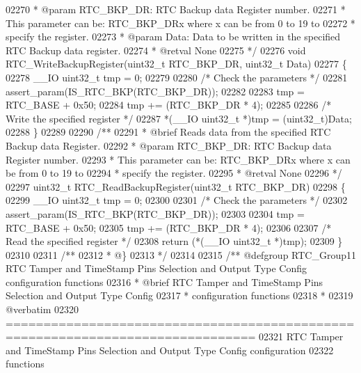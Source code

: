 \begin{DoxyCode}
02270 \textcolor{comment}{  * @param  RTC\_BKP\_DR: RTC Backup data Register number.}
02271 \textcolor{comment}{  *          This parameter can be: RTC\_BKP\_DRx where x can be from 0 to 19 to }
02272 \textcolor{comment}{  *                          specify the register.}
02273 \textcolor{comment}{  * @param  Data: Data to be written in the specified RTC Backup data register.                     }
02274 \textcolor{comment}{  * @retval None}
02275 \textcolor{comment}{  */}
02276 \textcolor{keywordtype}{void} RTC_WriteBackupRegister(uint32\_t RTC\_BKP\_DR, uint32\_t Data)
02277 \{
02278   \_\_IO uint32\_t tmp = 0;
02279 
02280   \textcolor{comment}{/* Check the parameters */}
02281   assert_param(IS\_RTC\_BKP(RTC\_BKP\_DR));
02282 
02283   tmp = RTC_BASE + 0x50;
02284   tmp += (RTC\_BKP\_DR * 4);
02285 
02286   \textcolor{comment}{/* Write the specified register */}
02287   *(\_\_IO uint32\_t *)tmp = (uint32\_t)Data;
02288 \}
02289 
02290 \textcolor{comment}{/**}
02291 \textcolor{comment}{  * @brief  Reads data from the specified RTC Backup data Register.}
02292 \textcolor{comment}{  * @param  RTC\_BKP\_DR: RTC Backup data Register number.}
02293 \textcolor{comment}{  *          This parameter can be: RTC\_BKP\_DRx where x can be from 0 to 19 to }
02294 \textcolor{comment}{  *                          specify the register.                   }
02295 \textcolor{comment}{  * @retval None}
02296 \textcolor{comment}{  */}
02297 uint32\_t RTC_ReadBackupRegister(uint32\_t RTC\_BKP\_DR)
02298 \{
02299   \_\_IO uint32\_t tmp = 0;
02300 
02301   \textcolor{comment}{/* Check the parameters */}
02302   assert_param(IS\_RTC\_BKP(RTC\_BKP\_DR));
02303 
02304   tmp = RTC_BASE + 0x50;
02305   tmp += (RTC\_BKP\_DR * 4);
02306 
02307   \textcolor{comment}{/* Read the specified register */}
02308   \textcolor{keywordflow}{return} (*(\_\_IO uint32\_t *)tmp);
02309 \}
02310 
02311 \textcolor{comment}{/**}
02312 \textcolor{comment}{  * @\}}
02313 \textcolor{comment}{  */}
02314 
02315 \textcolor{comment}{/** @defgroup RTC\_Group11 RTC Tamper and TimeStamp Pins Selection and Output Type Config configuration
       functions}
02316 \textcolor{comment}{ *  @brief   RTC Tamper and TimeStamp Pins Selection and Output Type Config }
02317 \textcolor{comment}{ *           configuration functions  }
02318 \textcolor{comment}{ *}
02319 \textcolor{comment}{@verbatim   }
02320 \textcolor{comment}{ ===============================================================================}
02321 \textcolor{comment}{  RTC Tamper and TimeStamp Pins Selection and Output Type Config configuration }
02322 \textcolor{comment}{  functions }

\end{DoxyCode}
